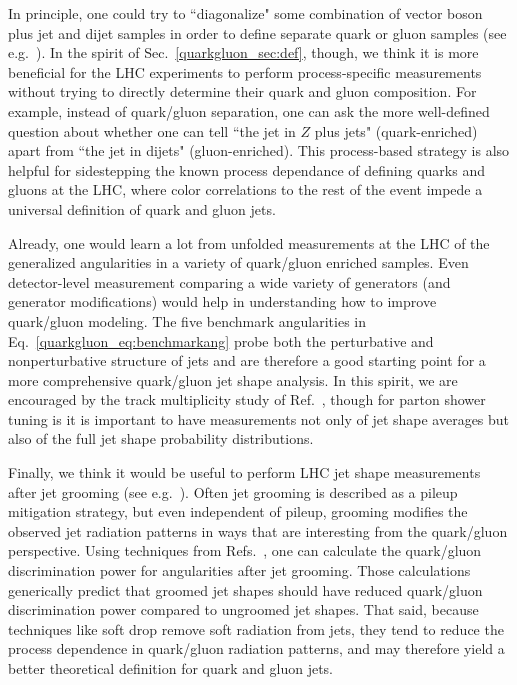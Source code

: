 \documentclass[11pt]{cernrep}
\begin{document}
In principle, one could try to ``diagonalize" some combination of vector boson plus jet and dijet samples in order to define separate quark or gluon samples (see e.g.~\cite{Aad:2014gea}).  In the spirit of Sec.~\ref{quarkgluon_sec:def}, though, we think it is more beneficial for the LHC experiments to perform process-specific measurements without trying to directly determine their quark and gluon composition.  For example, instead of quark/gluon separation, one can ask the more well-defined question about whether one can tell ``the jet in $Z$ plus jets" (quark-enriched) apart from ``the jet in dijets" (gluon-enriched).  This process-based strategy is also helpful for sidestepping the known process dependance of defining quarks and gluons at the LHC, where color correlations to the rest of the event impede a universal definition of quark and gluon jets.

Already, one would learn a lot from unfolded measurements at the LHC  of the generalized angularities in a variety of quark/gluon enriched samples.  Even detector-level measurement comparing a wide variety of generators (and generator modifications) would help in understanding how to improve quark/gluon modeling.   The five benchmark angularities in Eq.~\eqref{quarkgluon_eq:benchmarkang} probe both the perturbative and nonperturbative structure of jets and are therefore a good starting point for a more comprehensive quark/gluon jet shape analysis.  In this spirit, we are encouraged by the track multiplicity study of Ref.~\cite{Aad:2016oit}, though for parton shower tuning is it is important to have measurements not only of jet shape averages but also of the full jet shape probability distributions.

Finally, we think it would be useful to perform LHC jet shape measurements after jet grooming (see e.g.~\cite{Butterworth:2008iy,Ellis:2009su,Ellis:2009me,Krohn:2009th}).  Often jet grooming is described as a pileup mitigation strategy, but even independent of pileup, grooming modifies the observed jet radiation patterns in ways that are interesting from the quark/gluon perspective.  Using techniques from Refs.~\cite{Dasgupta:2013ihk,Larkoski:2014wba}, one can calculate the quark/gluon discrimination power for angularities after jet grooming.  Those calculations generically predict that groomed jet shapes should have reduced quark/gluon discrimination power compared to ungroomed jet shapes.  That said, because techniques like soft drop \cite{Larkoski:2014wba} remove soft radiation from jets, they tend to reduce the process dependence in quark/gluon radiation patterns, and may therefore yield a better theoretical definition for quark and gluon jets.
\end{document}
